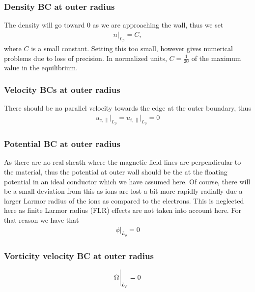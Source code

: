 
\subsubsection{Density BC at outer radius}
The density will go toward $0$ as we are approaching the wall, thus we set
%
\begin{align*}
    n \bigg|_{L_\rho} = C,
\end{align*}
%
where $C$ is a small constant.
Setting this too small, however gives numerical problems due to loss of precision.
In normalized units, $C = \frac{1}{20}$ of the maximum value in the equilibrium.

\subsubsection{Velocity BCs at outer radius}

There should be no parallel velocity towards the edge at the outer boundary, thus
%
\begin{align*}
    u_{e,\|} \bigg|_{L_\rho} = u_{i,\|} \bigg|_{L_\rho} = 0
\end{align*}

\subsubsection{Potential BC at outer radius}
%
As there are no real sheath where the magnetic field lines are perpendicular to the material, thus the potential at outer wall should be the at the floating potential in an ideal conductor which we have assumed here.
Of course, there will be a small deviation from this as ions are lost a bit more rapidly radially due a larger Larmor radius of the ions as compared to the electrons.
 This is neglected here as finite Larmor radius (FLR) effects are not taken into account here.
For that reason we have that
%
\begin{align*}
    \phi \bigg|_{L_\rho} = 0
\end{align*}

\subsubsection{Vorticity velocity BC at outer radius}
%
%
%
\begin{align*}
    \Omega \bigg|_{L_\rho} = 0
\end{align*}
